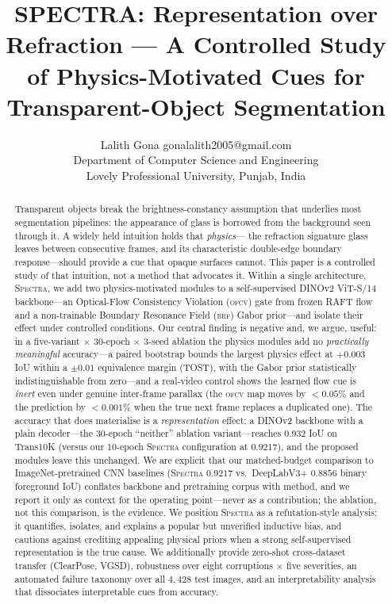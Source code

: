 \documentclass{article}
\title{SPECTRA: Representation over Refraction --- A Controlled Study of Physics-Motivated Cues for Transparent-Object Segmentation}
\author{\name Lalith Gona \email gonalalith2005@gmail.com \\
\addr Department of Computer Science and Engineering\\
Lovely Professional University, Punjab, India}
\newcommand{\spectra}{\textsc{Spectra}}
\newcommand{\ofcv}{\textsc{ofcv}}
\newcommand{\brf}{\textsc{brf}}
\newcommand{\dinov}{DINOv2}
\newcommand{\iou}{IoU}
\begin{document}
\maketitle
\begin{abstract}
Transparent objects break the brightness-constancy assumption that underlies
most segmentation pipelines: the appearance of glass is borrowed from the
background seen through it. A widely held intuition holds that \emph{physics}---
the refraction signature glass leaves between consecutive frames, and its
characteristic double-edge boundary response---should provide a cue that opaque
surfaces cannot. This paper is a controlled study of that intuition, not a
method that advocates it. Within a single architecture, \spectra, we add two
physics-motivated modules to a self-supervised \dinov{} ViT-S/14 backbone---an
Optical-Flow Consistency Violation (\ofcv) gate from frozen RAFT flow and a
non-trainable Boundary Resonance Field (\brf) Gabor prior---and isolate their
effect under controlled conditions. Our central finding is negative and, we
argue, useful: in a five-variant $\times$ 30-epoch $\times$ 3-seed ablation the
physics modules add no \emph{practically meaningful} accuracy---a paired
bootstrap bounds the largest physics effect at $+0.003$ \iou{} within a
$\pm0.01$ equivalence margin (TOST), with the Gabor prior statistically
indistinguishable from zero---and a real-video control shows the learned flow
cue is \emph{inert} even under genuine inter-frame parallax (the
\ofcv{} map moves by $<0.05\%$ and the prediction by $<0.001\%$ when the true
next frame replaces a duplicated one). The accuracy that does materialise is a
\emph{representation} effect: a \dinov{} backbone with a plain decoder---the
30-epoch ``neither'' ablation variant---reaches $0.932$ \iou{} on Trans10K
(versus our 10-epoch \spectra{} configuration at $0.9217$), and the proposed
modules leave this unchanged. We are explicit that our matched-budget comparison to
ImageNet-pretrained CNN baselines (\spectra{} $0.9217$ vs.\ DeepLabV3+ $0.8856$
binary foreground \iou) conflates backbone and pretraining corpus with method,
and we report it only as context for the operating point---never as a
contribution; the ablation, not this comparison, is the evidence. We position
\spectra{} as a refutation-style analysis: it quantifies, isolates, and explains
a popular but unverified inductive bias, and cautions against crediting appealing
physical priors when a strong self-supervised representation is the true cause.
We additionally provide zero-shot cross-dataset transfer (ClearPose, VGSD),
robustness over eight corruptions $\times$ five severities, an automated failure
taxonomy over all $4{,}428$ test images, and an interpretability analysis that
dissociates interpretable cues from accuracy.
\end{abstract}
\end{document}
